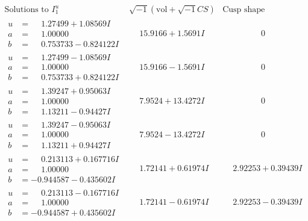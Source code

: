 \documentclass[1p]{elsarticle_modified}
\theoremstyle{definition}
\newcommand{\I}{\sqrt{-1}}
\begin{document}
$$\begin{array}{c|c|c}
\text{Solutions to }I^u_{1}& \I (\text{vol} + \sqrt{-1}CS) & \text{Cusp shape}\\
 \hline 
\begin{aligned}
u &= \phantom{-}1.27499 + 1.08569 I \\
a &= \phantom{-}1.00000\phantom{ +0.000000I} \\
b &= \phantom{-}0.753733 - 0.824122 I\end{aligned}
 & \phantom{-}15.9166 + 1.5691 I & \phantom{-0.000000 } 0 \\ \hline\begin{aligned}
u &= \phantom{-}1.27499 - 1.08569 I \\
a &= \phantom{-}1.00000\phantom{ +0.000000I} \\
b &= \phantom{-}0.753733 + 0.824122 I\end{aligned}
 & \phantom{-}15.9166 - 1.5691 I & \phantom{-0.000000 } 0 \\ \hline\begin{aligned}
u &= \phantom{-}1.39247 + 0.95063 I \\
a &= \phantom{-}1.00000\phantom{ +0.000000I} \\
b &= \phantom{-}1.13211 - 0.94427 I\end{aligned}
 & \phantom{-}7.9524 + 13.4272 I & \phantom{-0.000000 } 0 \\ \hline\begin{aligned}
u &= \phantom{-}1.39247 - 0.95063 I \\
a &= \phantom{-}1.00000\phantom{ +0.000000I} \\
b &= \phantom{-}1.13211 + 0.94427 I\end{aligned}
 & \phantom{-}7.9524 - 13.4272 I & \phantom{-0.000000 } 0 \\ \hline\begin{aligned}
u &= \phantom{-}0.213113 + 0.167716 I \\
a &= \phantom{-}1.00000\phantom{ +0.000000I} \\
b &= -0.944587 - 0.435602 I\end{aligned}
 & \phantom{-}1.72141 + 0.61974 I & \phantom{-}2.92253 + 0.39439 I \\ \hline\begin{aligned}
u &= \phantom{-}0.213113 - 0.167716 I \\
a &= \phantom{-}1.00000\phantom{ +0.000000I} \\
b &= -0.944587 + 0.435602 I\end{aligned}
 & \phantom{-}1.72141 - 0.61974 I & \phantom{-}2.92253 - 0.39439 I \\ \hline\begin{aligned}

\end{aligned}
\end{array}$$
\end{document}
